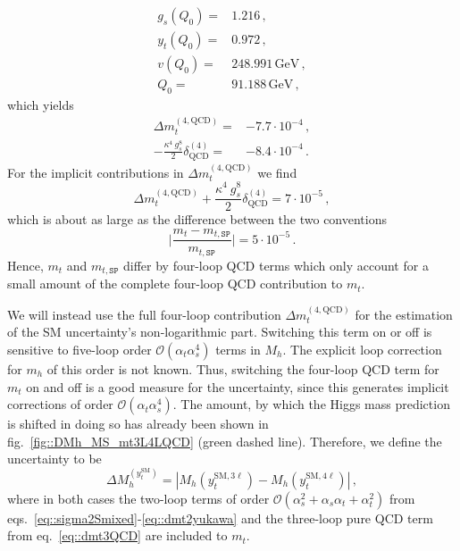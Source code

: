 \documentclass[a4paper,12pt]{book}
\begin{document}
\begin{align}
g_s(Q_0) ={}& 1.216\,,\\
y_t(Q_0) ={}& 0.972\,,\\
v(Q_0) ={}& 248.991\,\mathrm{GeV}\,,\\
Q_0={}& 91.188\,\mathrm{GeV}\,,
\end{align}
which yields
\begin{align}
\Delta m_t^{(4,\text{QCD})}= {}& -7.7\cdot 10^{-4}\,,\\
-\frac{\kappa^4 \> g_s^8}{2}\delta^{(4)}_\text{QCD} ={}&-8.4\cdot 10^{-4}\,.
\end{align}
For the implicit contributions in $\Delta m_t^{(4,\text{QCD})}$ we find 
\begin{equation}
\Delta m_t^{(4,\text{QCD})}+\frac{\kappa^4 \> g_s^8}{2}\delta^{(4)}_\text{QCD} = 7 \cdot 10^{-5}\,,
\end{equation}
which is about as large as the difference between the two conventions 
\begin{equation}
\bigg|\frac{m_t-m_{t,\texttt{SP}}}{m_{t,\texttt{SP}}}\bigg| = 5\cdot 10^{-5}\,.
\end{equation}
Hence, $m_t$ and $m_{t,\texttt{SP}}$ differ by four-loop QCD terms which only account for a small amount of the complete four-loop QCD contribution to $m_t$.\par
We will instead use the full four-loop contribution $\Delta m_t^{(4,\text{QCD})}$ for the estimation of the SM uncertainty's non-logarithmic part. Switching this term on or off is sensitive to five-loop order $\mathcal{O}(\alpha_t\alpha_s^4)$ terms in $M_h$. The explicit loop correction for $m_h$ of this order is not known. Thus, switching the four-loop QCD term for $m_t$ on and off is a good measure for the uncertainty, since this generates implicit corrections of order $\mathcal{O}(\alpha_t\alpha_s^4)$. The amount, by which the Higgs mass prediction is shifted in doing so has already been shown in fig.\ \ref{fig::DMh_MS_mt3L4LQCD} (green dashed line). Therefore, we define the uncertainty to be
\begin{equation}
\Delta M_h^{(y_t^\text{SM})}= |M_h(y^{\text{SM},3\ell}_t)-M_h(y^{\text{SM},4\ell}_t)|\,,
\end{equation} 
where in both cases the two-loop terms of order $\mathcal{O}(\alpha_s^2+\alpha_s\alpha_t+\alpha_t^2)$ from eqs.\ \eqref{eq::sigma2Smixed}-\eqref{eq::dmt2yukawa}  and the three-loop pure QCD term from eq.\ \eqref{eq::dmt3QCD} are included to $m_t$.
\end{document}
